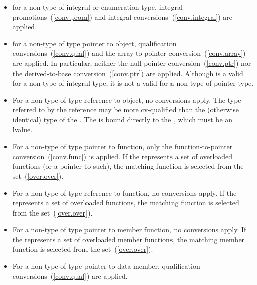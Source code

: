 \begin{itemize}
\item
for a non-type
of integral or enumeration type, integral promotions~(\ref{conv.prom}) and
integral conversions~(\ref{conv.integral}) are applied.
\item
for a non-type
of type pointer to object,
qualification conversions~(\ref{conv.qual}) and
the array-to-pointer conversion~(\ref{conv.array}) are applied.
\enternote
In particular, neither the null pointer conversion~(\ref{conv.ptr}) nor the
derived-to-base conversion~(\ref{conv.ptr}) are applied.
Although
is a valid
for a non-type
of integral type, it is not a valid
for a non-type
of pointer type.
\exitnote
\item
For a non-type
of type reference to object,
no conversions apply.
The type referred to by the reference may be more cv-qualified than the
(otherwise identical) type of the
.
The
is bound directly to the
,
which must be an lvalue.
\item
For a non-type
of type pointer to function, only the function-to-pointer conversion~(\ref{conv.func})
is applied.
If the
represents a set of overloaded functions (or a pointer to such), the matching
function is selected from the set~(\ref{over.over}).
\item
For a non-type
of type reference to function, no conversions apply.
If the
represents a set of overloaded functions, the matching function is selected
from the set~(\ref{over.over}).
\item
For a non-type
of type pointer to member function, no conversions apply.
If the
represents a set of overloaded member functions, the matching
member function is selected from the set~(\ref{over.over}).
\item
For a non-type
of type pointer to data member,
qualification conversions~(\ref{conv.qual})
are applied.
\end{itemize}

